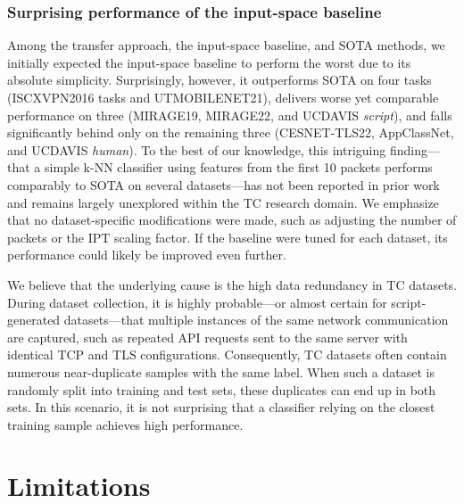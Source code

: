 \documentclass[lettersize,journal,twoside,article]{IEEEtran}
\begin{document}
\subsubsection{Surprising performance of the input-space baseline}
\label{sec:input-space-transfer-results}
Among the transfer approach, the input-space baseline, and SOTA methods, we initially expected the input-space baseline to perform the worst due to its absolute simplicity. Surprisingly, however, it outperforms SOTA on four tasks (ISCXVPN2016 tasks and UTMOBILENET21), delivers worse yet comparable performance on three (MIRAGE19, MIRAGE22, and UCDAVIS \textit{script}), and falls significantly behind only on the remaining three (CESNET-TLS22, AppClassNet, and UCDAVIS \textit{human}). To the best of our knowledge, this intriguing finding---that a simple k-NN classifier using features from the first 10 packets performs comparably to SOTA on several datasets---has not been reported in prior work and remains largely unexplored within the TC research domain. We emphasize that no dataset-specific modifications were made, such as adjusting the number of packets or the IPT scaling factor. If the baseline were tuned for each dataset, its performance could likely be improved even further.

We believe that the underlying cause is the high data redundancy in TC datasets. During dataset collection, it is highly probable---or almost certain for script-generated datasets---that multiple instances of the same network communication are captured, such as repeated API requests sent to the same server with identical TCP and TLS configurations. Consequently, TC datasets often contain numerous near-duplicate samples with the same label. When such a dataset is randomly split into training and test sets, these duplicates can end up in both sets. In this scenario, it is not surprising that a classifier relying on the closest training sample achieves high performance.

\section{Limitations}
\label{sec:limitations}
\end{document}
